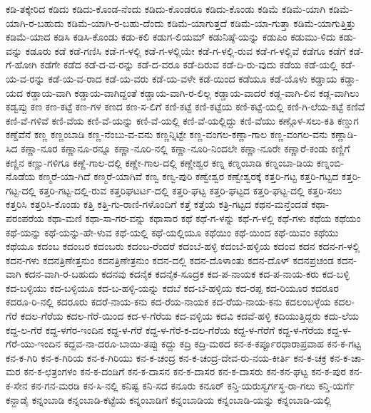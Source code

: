 ಕಡಿ-ತಕ್ಕೇರಿದ
ಕಡಿದು
ಕಡಿದು-ಕೊಂಡ-ನೆಂದು
ಕಡಿದು-ಕೊಂಡರೂ
ಕಡಿದು-ಕೊಂಡು
ಕಡಿಮೆ
ಕಡಿಮೆ-ಯಾಗಿ
ಕಡಿಮೆ-ಯಾಗಿ-ರ-ಬಹುದು
ಕಡಿಮೆ-ಯಾಗಿ-ರ-ಬಹು-ದೆಂದು
ಕಡಿಮೆ-ಯಾಗುತ್ತದೆ
ಕಡಿಮೆ-ಯಾ-ಗುತ್ತಾ
ಕಡಿಮೆ-ಯಾಗುತ್ತಿತ್ತು
ಕಡಿಮೆ-ಯಾದ
ಕಡಿಸಿ
ಕಡಿಸಿ-ಕೊಂಡು
ಕಡು-ಕಲಿ
ಕಡುಗ-ಲಿಯಮ್
ಕಡುನಿಷ್ಠೆ-ಯನ್ನು
ಕಡುಪಿಂ
ಕಡುಮು-ಳಿದು
ಕಡು-ವನ್ನು
ಕಡೂರು
ಕಡೆ
ಕಡೆ-ಗಣಿಸಿ
ಕಡೆ-ಗ-ಳಲ್ಲಿ
ಕಡೆ-ಗ-ಳಲ್ಲಿಯೇ
ಕಡೆ-ಗ-ಳಲ್ಲಿ-ರುವ
ಕಡೆ-ಗ-ಳಲ್ಲಿವೆ
ಕಡೆಗೂ
ಕಡೆಗೆ
ಕಡೆ-ಗೆ-ಹೋಗಿ
ಕಡೆಗೇ
ಕಡೆದ
ಕಡೆ-ದ-ವ-ರನ್ನು
ಕಡೆ-ದ-ವರೂ
ಕಡೆ-ದಿರುವ
ಕಡೆ-ದಿ-ರು-ವುದು
ಕಡೆಯ
ಕಡೆ-ಯಲ್ಲಿ
ಕಡೆ-ಯ-ವ-ರನ್ನು
ಕಡೆ-ಯ-ವ-ರಾದ
ಕಡೆ-ಯ-ವರು
ಕಡೆ-ಯ-ವಳೇ
ಕಡೆ-ಯಿಂದ
ಕಡೆಯೂ
ಕಡೆ-ಯೊಳು
ಕಡ್ಡಾಯ
ಕಡ್ಡಾ-ಯದ
ಕಡ್ಡಾಯ-ವಾಗಿ
ಕಡ್ಡಾಯ-ವಾಗಿದ್ದಂತೆ
ಕಡ್ಡಾಯ-ವಾಗಿ-ರ-ಲಿಲ್ಲ
ಕಡ್ಡಾಯ-ವಾದರೆ
ಕಡ್ಲ-ವಾಗಿ-ಲಿನ
ಕಡ್ಲ-ವಾಗಿಲು
ಕಡ್ವಪ್ಪು
ಕಣ
ಕಣ-ಕಟ್ಟೆ
ಕಣ-ಗಳ
ಕಣದ
ಕಣ-ಸ-ಲಿಗೆ
ಕಣಿ-ಕಟ್ಟೆ
ಕಣಿ-ಕಟ್ಟೆಯ
ಕಣಿ-ಕಟ್ಟೆ-ಯಲ್ಲಿ
ಕಣಿ-ಗಿ-ಲೆಯ-ಕಟ್ಟೆ
ಕಣಿವೆ
ಕಣಿ-ವೆ-ಗಳಿವೆ
ಕಣಿ-ವೆಯ
ಕಣಿ-ವೆ-ಯನ್ನು
ಕಣಿ-ವೆ-ಯಲ್ಲಿ
ಕಣಿ-ವೆ-ಯಲ್ಲಿದ್ದು
ಕಣಿ-ವೆಯು
ಕಣ್ಗೊಳ-ಸಲು-ಕತಿ
ಕಣ್ಡುಗ
ಕಣ್ಡೆವೆನೆ
ಕಣ್ಣ
ಕಣ್ಣಂಬಾಡಿ
ಕಣ್ಣ-ನೆಂಬು-ವ-ವನು
ಕಣ್ಣನ್ನಿಟ್ಟೇ
ಕಣ್ಣ-ವಂಗಲ-ಕಣ್ಣಾ-ಗಾಲ
ಕಣ್ಣ-ವಂಗಲ-ವನು
ಕಣ್ಣಾಡಿ-ಸಿದ
ಕಣ್ಣಾ-ನೂರ
ಕಣ್ಣಾನೂ-ರನ್ನೂ
ಕಣ್ಣಾ-ನೂರಿ-ನಲ್ಲಿ
ಕಣ್ಣಾ-ನೂರಿ-ನಿಂದಲೇ
ಕಣ್ಣಾ-ನೂರೇ
ಕಣ್ಣಾರೆ-ಕಂಡು
ಕಣ್ಣಿಗೆ
ಕಣ್ಣಿನ
ಕಣ್ಣು-ಗಳಿಗೂ
ಕಣ್ಣೆ-ಗಾಲ-ದಲ್ಲಿ
ಕಣ್ಣೇ-ಗಾಲ-ದಲ್ಲಿ
ಕಣ್ಣೇಶ್ವರ
ಕಣ್ನ
ಕಣ್ನಂಬಾಡಿ
ಕಣ್ನಂಬಾ-ಡಿಯ
ಕಣ್ನಂಬಿ-ನೊಡೆಯ
ಕಣ್ಮರೆ-ಯಾ-ಗಿದೆ
ಕಣ್ಮರೆ-ಯಾಗಿವೆ
ಕಣ್ವ
ಕಣ್ವ-ಪುರಿ
ಕಣ್ವೇಶ್ವರ
ಕಣ್ವೇಶ್ವರಕ್ಕೆ
ಕತ್ತರಿ-ಗಟ್ಟ
ಕತ್ತರಿ-ಗಟ್ಟದ
ಕತ್ತರಿ-ಗಟ್ಟ-ದಲ್ಲಿ
ಕತ್ತರಿ-ಗಟ್ಟ-ದಲ್ಲಿ-ರುವ
ಕತ್ತರಿಘಟರ್ಟ-ದಲ್ಲಿ
ಕತ್ತರಿ-ಘಟ್ಟ
ಕತ್ತರಿ-ಘಟ್ಟದ
ಕತ್ತರಿ-ಘಟ್ಟ-ದಲ್ಲಿ
ಕತ್ತರಿ-ಸಲು
ಕತ್ತರಿಸಿ
ಕತ್ತರಿಸಿ-ಕೊಂಡು
ಕತ್ತಿ
ಕತ್ತಿ-ಗು-ರಾಣಿ-ಗಳೊಂದಿಗೆ
ಕತ್ತೆ
ಕತ್ತೆಯ
ಕತ್ರಿ-ಗಟ್ಟದ
ಕಥನ-ಮನ್ತೆಂದಡೆ
ಕಥಾ-ಪರಂಪರೆಯ
ಕಥಾ-ಮಣಿ
ಕಥಾ-ಸಾ-ಗರ-ವನ್ನು
ಕಥಾಸಾರ
ಕಥೆ
ಕಥೆ-ಗ-ಳನ್ನು
ಕಥೆ-ಗ-ಳಲ್ಲಿ
ಕಥೆ-ಗಳು
ಕಥೆಯ
ಕಥೆಯಂ
ಕಥೆ-ಯನ್ನು
ಕಥೆ-ಯನ್ನು-ಹೇ-ಳುವ
ಕಥೆ-ಯಲ್ಲಿ
ಕಥೆ-ಯಲ್ಲಿಯೂ
ಕಥೆಯಿಂ
ಕಥೆ-ಯಿಂದ
ಕಥೆ-ಯಿವಂ
ಕಥೆಯು
ಕಥೆಯೂ
ಕದಂಬ
ಕದಂಬರ
ಕದಂಬರು
ಕದಂಬ-ರೆಂದರೆ
ಕದಂಬೆ-ಹಳ್ಳಿ
ಕದಂಬೆ-ಹಳ್ಳಿಯ
ಕದಂವ
ಕದನ
ಕದನ-ಗ-ಳಲ್ಲಿ
ಕದನ-ಗಳು
ಕದನತ್ರಿಣೇತ್ತನುಂ
ಕದನತ್ರಿಣೇತ್ರನುಂ
ಕದನ-ದಲ್ಲಿ
ಕದನ-ದೊಳಾಂತು
ಕದನ-ದೊಳ್
ಕದನಪ್ರಚಂಡ
ಕದನ-ವಾಗಿ
ಕದನ-ವಾಗಿ-ರ-ಬಹುದು
ಕದನವು
ಕದನೈಕ
ಕದನೈಕ-ಸೂದ್ರಕ
ಕದ-ಪ-ನಾಯಕ
ಕದ-ಪ-ನಾಯ-ಕರು
ಕದ-ಬಳ್ಳಿ
ಕದ-ಬಳ್ಳಿಯು
ಕದ-ಬಳ್ಳಿಯೂ
ಕದ-ಬ-ಹಳ್ಳಿ-ಯನ್ನು
ಕದಬೆ
ಕದ-ಬೆ-ಹಳ್ಳಿಯ
ಕದ-ರಪ್ಪ
ಕದ-ರಿಯೂರ
ಕದರೂರ
ಕದರೂ-ರಿ-ನಲ್ಲಿ
ಕದರೂರು
ಕದರೆ-ನಾಯ-ಕನು
ಕದ-ರೆಯ-ನಾಯಕ
ಕದ-ರೆಯ-ನಾಯ-ಕನು
ಕದಲಂಬಳ್ಳೆಯ
ಕದಲ-ಗೆರೆ
ಕದಲ-ಗೆರೆಯ
ಕದಲ-ಗೆರೆ-ಯಿಂದ
ಕದ-ಳ-ಗೆರೆಯ
ಕದ-ವಳ್ಳಿಯ
ಕದವಿ
ಕದವೆ-ಹಳ್ಳಿ
ಕದಿಯುತ್ತಿದ್ದರು
ಕದು-ಲೆಯ
ಕದ್ದ-ಲ-ಗೆರೆ
ಕದ್ದ-ಳಗೆರ-ಇಂದಿನ
ಕದ್ದ-ಳ-ಗೆರೆ
ಕದ್ದ-ಳ-ಗೆರೆ-ಕ-ದಲ-ಗೆರೆಯ
ಕದ್ದ-ಳ-ಗೆರೆಗೆ
ಕದ್ದ-ಳ-ಗೆರೆಯ
ಕದ್ದ-ಳ-ಗೆರೆ-ಯು-ಇಂದಿನ
ಕದ್ದವ-ನಾ-ದರೂ-ಬಾಯಿ-ತಪ್ಪು
ಕದ್ದು
ಕದ್ರಿ
ಕದ್ರಿ-ಮಠದ
ಕನ-ಕ-ಕರ್ಪ್ಪೂರಧಾರಾಪ್ರವಾಹ
ಕನ-ಕ-ಗಟ್ಟ
ಕನ-ಕ-ಗಿರಿ
ಕನ-ಕ-ಗಿರಿಯ
ಕನ-ಕ-ಗಿರಿಯು
ಕನ-ಕ-ಚಂದ್ರ
ಕನ-ಕ-ಚಂದ್ರ-ದೇವ-ರು-ನಯ-ಕೀರ್ತಿ
ಕನ-ಕ-ಚಕ್ರ
ಕನ-ಕ-ಚಾ-ಮರ
ಕನ-ಕ-ಛತ್ರಂಗಳಂ
ಕನ-ಕ-ದಂಡಿಗೆ
ಕನ-ಕ-ದಾಸನ
ಕನ-ಕ-ದಾಸರ
ಕನ-ಕ-ದಾಸರು
ಕನ-ಕನ-ಘಟ್ಟ
ಕನ-ಕ-ಪುರ
ಕನ-ಕ-ಸೇನ
ಕನ-ಗನ-ಮರಡಿ
ಕನ-ಸಿ-ನಲ್ಲಿ
ಕನಿಷ್ಟ
ಕನಿ-ಸದ
ಕನೂರು
ಕನೂರ್
ಕನ್ತಿ-ಯರುಸ್ವರ್ಗಸ್ಥ-ರಾ-ಗಲು
ಕನ್ತಿ-ಯರ್ಗೆ
ಕನ್ದಾಡೈ
ಕನ್ನಂಬಾಡಿ
ಕನ್ನಂಬಾಡಿ-ಕಟ್ಟೆಯ
ಕನ್ನಂಬಾಡಿಗೆ
ಕನ್ನಂಬಾಡಿಯ
ಕನ್ನಂಬಾಡಿ-ಯನ್ನು
ಕನ್ನಂಬಾಡಿ-ಯಲ್ಲಿ

